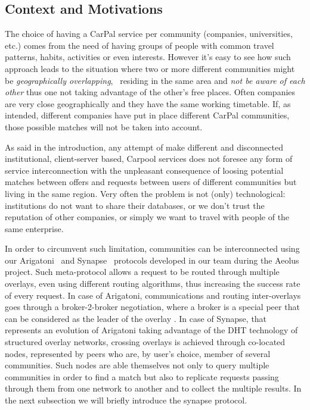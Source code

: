 \subsection{Context and Motivations}
%
The choice of having a CarPal service per community (companies,
universities, etc.) comes from the need of having groups of people with
common travel patterns, habits, activities or even interests.  However
it's easy to see how such approach leads to the situation where two or
more different communities might be \emph{geographically overlapping},
\ie\ residing in the same area and \emph{not be aware of each other}
thus one not taking advantage of the other's free places. Often
companies are very close geographically and they have the same working
timetable. If, as intended, different companies have put in place
different CarPal communities, those possible matches will not be
taken into account.

As said in the introduction, any attempt of make different and
disconnected institutional, client-server based, Carpool services does
not foresee any form of service interconnection with the unpleasant
consequence of loosing potential matches between offers and requests
between users of different communities but living in the same region.
Very often the problem is not (only) technological: institutions do
not want to share their databases, or we don't trust the reputation
of other companies, or simply we want to travel with people of the
same enterprise.

In order to circumvent such limitation, communities can be
interconnected using our Arigatoni~\cite{CCL08} and
Synapse~\cite{LTVBCM09,LTB09} protocols developed in our team during
the Aeolus project.  Such meta-protocol allows a request to be routed
through multiple overlays, even using different routing algorithms,
thus increasing the success rate of every request. In case of
Arigatoni, communications and routing inter-overlays goes through a
broker-2-broker negotiation, where a broker is a special peer that can
be considered as the leader of the overlay \cite{LC07b}. In case of
Synapse, that represents an evolution of Arigatoni taking advantage of
the DHT technology of structured overlay networks, crossing overlays
is achieved through co-located nodes, represented by peers who are, by
user's choice, member of several communities.  Such nodes are able
themselves not only to query multiple communities in order to find a
match but also to replicate requests passing through them from one
network to another and to collect the multiple results. In the next
subsection we will briefly introduce the synapse protocol.


